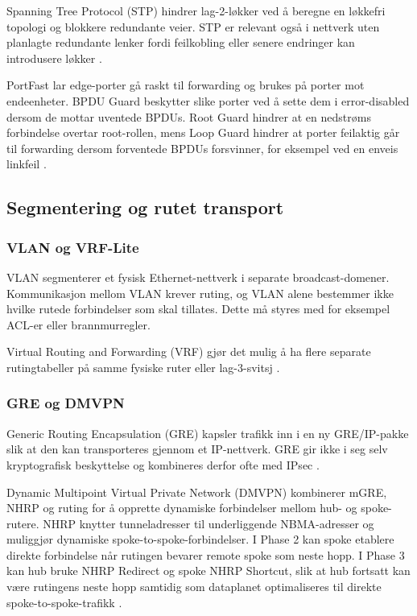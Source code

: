 Spanning Tree Protocol (STP) hindrer lag-2-løkker ved å beregne en løkkefri topologi og blokkere redundante veier. STP er relevant også i nettverk uten planlagte redundante lenker fordi feilkobling eller senere endringer kan introdusere løkker \cite{cisco_stp_3850}.

PortFast lar edge-porter gå raskt til forwarding og brukes på porter mot endeenheter. BPDU Guard beskytter slike porter ved å sette dem i error-disabled dersom de mottar uventede BPDUs. Root Guard hindrer at en nedstrøms forbindelse overtar root-rollen, mens Loop Guard hindrer at porter feilaktig går til forwarding dersom forventede BPDUs forsvinner, for eksempel ved en enveis linkfeil \cite{forsvaret_nettverk_rolle1,nsm_n03}.

\subsection{Segmentering og rutet transport}

\subsubsection{VLAN og VRF-Lite}

VLAN segmenterer et fysisk Ethernet-nettverk i separate broadcast-domener. Kommunikasjon mellom VLAN krever ruting, og VLAN alene bestemmer ikke hvilke rutede forbindelser som skal tillates. Dette må styres med for eksempel ACL-er eller brannmurregler.

Virtual Routing and Forwarding (VRF) gjør det mulig å ha flere separate rutingtabeller på samme fysiske ruter eller lag-3-svitsj \cite{forsvaret_nettverk_rolle1}.

\subsubsection{GRE og DMVPN}

Generic Routing Encapsulation (GRE) kapsler trafikk inn i en ny GRE/IP-pakke slik at den kan transporteres gjennom et IP-nettverk. GRE gir ikke i seg selv kryptografisk beskyttelse og kombineres derfor ofte med IPsec \cite{rfc2784,cisco_dmvpn_current}.

Dynamic Multipoint Virtual Private Network (DMVPN) kombinerer mGRE, NHRP og ruting for å opprette dynamiske forbindelser mellom hub- og spoke-rutere. NHRP knytter tunneladresser til underliggende NBMA-adresser og muliggjør dynamiske spoke-to-spoke-forbindelser. I Phase 2 kan spoke etablere direkte forbindelse når rutingen bevarer remote spoke som neste hopp. I Phase 3 kan hub bruke NHRP Redirect og spoke NHRP Shortcut, slik at hub fortsatt kan være rutingens neste hopp samtidig som dataplanet optimaliseres til direkte spoke-to-spoke-trafikk \cite{cisco_dmvpn_current,dmvpn_phase_3}.

